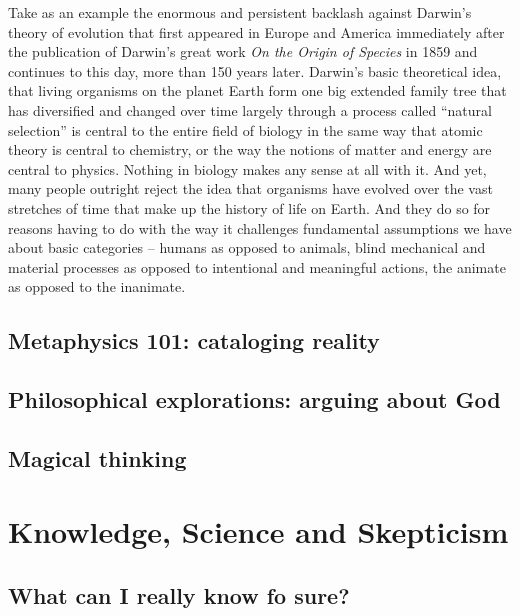 \documentclass[
  12pt, openany]{book}
\begin{document}
Take as an example the enormous and persistent backlash against Darwin's theory of evolution that first appeared in Europe and America immediately after the publication of Darwin's great work \emph{On the Origin of Species} in 1859 and continues to this day, more than 150 years later. Darwin's basic theoretical idea, that living organisms on the planet Earth form one big extended family tree that has diversified and changed over time largely through a process called ``natural selection'' is central to the entire field of biology in the same way that atomic theory is central to chemistry, or the way the notions of matter and energy are central to physics. Nothing in biology makes any sense at all with it. And yet, many people outright reject the idea that organisms have evolved over the vast stretches of time that make up the history of life on Earth. And they do so for reasons having to do with the way it challenges fundamental assumptions we have about basic categories -- humans as opposed to animals, blind mechanical and material processes as opposed to intentional and meaningful actions, the animate as opposed to the inanimate.

\hypertarget{metaphysics-101-cataloging-reality}{%
\section{Metaphysics 101: cataloging reality}\label{metaphysics-101-cataloging-reality}}

\hypertarget{philosophical-explorations-arguing-about-god}{%
\section{Philosophical explorations: arguing about God}\label{philosophical-explorations-arguing-about-god}}

\hypertarget{magical-thinking}{%
\section{Magical thinking}\label{magical-thinking}}

\hypertarget{knowledge-science-and-skepticism}{%
\chapter{Knowledge, Science and Skepticism}\label{knowledge-science-and-skepticism}}

\hypertarget{what-can-i-really-know-fo-sure}{%
\section{What can I really know fo sure?}\label{what-can-i-really-know-fo-sure}}
\end{document}
